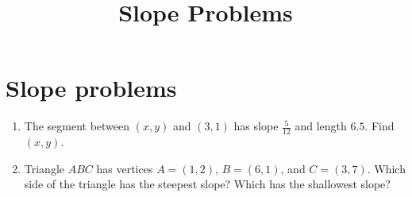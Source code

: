\documentclass[12pt]{article}
\title{Slope Problems}
\author{}
\date{}
\begin{document}
\maketitle

\section*{Slope problems}

\begin{enumerate}
    \item The segment between $ (x, y) $ and $ (3, 1) $ has slope $ \frac{5}{12} $ and length $ 6.5 $. Find $ (x, y) $.

    \item Triangle $ABC$ has vertices $A = (1, 2)$, $B = (6, 1)$, and $C = (3, 7)$. Which side of the triangle has the steepest slope? Which has the shallowest slope?
\end{enumerate}
\end{document}

